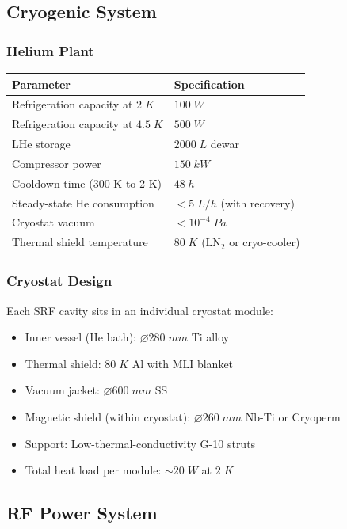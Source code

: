 \documentclass[11pt,a4paper]{article}
\begin{document}
\subsection{Cryogenic System}

\subsubsection{Helium Plant}

\begin{longtable}{p{}p{}}
\toprule
\textbf{Parameter} & \textbf{Specification} \\
\midrule
\endhead
Refrigeration capacity at $2\;\si{K}$ & $100\;\si{W}$ \\
Refrigeration capacity at $4.5\;\si{K}$ & $500\;\si{W}$ \\
LHe storage & $2000\;\si{L}$ dewar \\
Compressor power & $150\;\si{kW}$ \\
Cooldown time (300 K to 2 K) & $48\;\si{h}$ \\
Steady-state He consumption & $< 5\;\si{L/h}$ (with recovery) \\
Cryostat vacuum & $< 10^{-4}\;\si{Pa}$ \\
Thermal shield temperature & $80\;\si{K}$ (LN$_2$ or cryo-cooler) \\
\bottomrule
\end{longtable}

\subsubsection{Cryostat Design}

Each SRF cavity sits in an individual cryostat module:
\begin{itemize}[nosep]
\item Inner vessel (He bath): $\varnothing 280\;\si{mm}$ Ti alloy
\item Thermal shield: $80\;\si{K}$ Al with MLI blanket
\item Vacuum jacket: $\varnothing 600\;\si{mm}$ SS
\item Magnetic shield (within cryostat): $\varnothing 260\;\si{mm}$
Nb-Ti or Cryoperm
\item Support: Low-thermal-conductivity G-10 struts
\item Total heat load per module: $\sim 20\;\si{W}$ at $2\;\si{K}$
\end{itemize}

\subsection{RF Power System}
\end{document}
